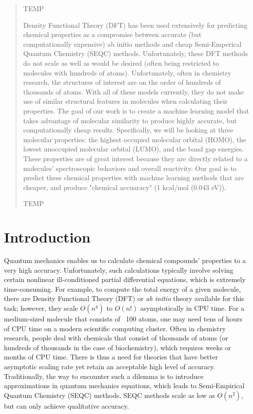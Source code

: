 \begin{abstract}
TEMP

Density Functional Theory (DFT) has been used extensively for predicting chemical properties as a compromise between accurate (but computationally expensive) ab initio methods and cheap Semi-Emperical Quantum Chemistry (SEQC) methods. Unfortunately, these DFT methods do not scale as well as would be desired (often being restricted to molecules with hundreds of atoms). Unfortunately, often in chemistry research, the structures of interest are on the order of hundreds of thousands of atoms. With all of these models currently, they do not make use of similar structural features in molecules when calculating their properties. The goal of our work is to create a machine learning model that takes advantage of molecular similarity to produce highly accurate, but computationally cheap results. Specifically, we will be looking at three molecular properties: the highest occupied molecular orbital (HOMO), the lowest unoccupied molecular orbital (LUMO), and the band gap energies. These properties are of great interest because they are directly related to a molecules' spectroscopic behaviors and overall reactivity. Our goal is to predict these chemical properties with machine learning methods that are cheaper, and produce "chemical accuaracy" (1 kcal/mol (0.043 eV)).

TEMP
\end{abstract}
\section{Introduction}
\noindent Quantum mechanics enables us to calculate chemical compounds' properties to a very high accuracy. Unfortunately, such calculations typically involve solving certain nonlinear ill-conditioned partial differential equations, which is extremely time-consuming. For example, to compute the total energy of a given molecule, there are Density Functional Theory (DFT) or \textit{ab initio} theory available for this task; however, they scale $O(n^4)$ to $O(n!)$ asymptotically in CPU time. For a medium-sized molecule that consists of ~100 atoms, one may need tens of hours of CPU time on a modern scientific computing cluster. Often in chemistry research, people deal with chemicals that consist of thousands of atoms (or hundreds of thousands in the case of biochemistry), which requires weeks or months of CPU time. There is thus a need for theories that have better asymptotic scaling rate yet retain an acceptable high level of accuracy. Traditionally, the way to encounter such a dilemma is to introduce approximations in quantum mechanics equations, which leads to Semi-Empirical Quantum Chemistry (SEQC) methods. SEQC methods scale as low as $O(n^2)$, but can only achieve qualitative accuracy. \\

